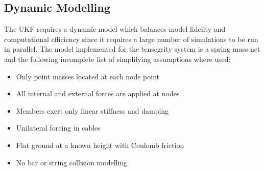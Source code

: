 {\subsection{Dynamic Modelling} 
\label{sec:dynamic_modeling_sb}

The UKF requires a dynamic model which balances model fidelity and computational efficiency since it requires a large number of simulations to be run in parallel. 
The model implemented for the tensegrity system is a spring-mass net and the following incomplete list of simplifying assumptions where used:
\begin{itemize}
  \item Only point masses located at each node point
  \item All internal and external forces are applied at nodes
  \item Members exert only linear stiffness and damping
  \item Unilateral forcing in cables
  \item Flat ground at a known height with Coulomb friction
  \item No bar or string collision modelling
\end{itemize}

}
